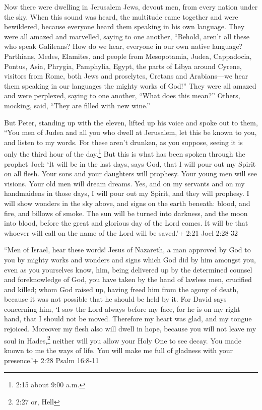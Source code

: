  Now there were dwelling in Jerusalem Jews, devout men, from
every nation under the sky.  When this sound was heard, the
multitude came together and were bewildered, because everyone heard them
speaking in his own language.  They were all amazed and
marvelled, saying to one another, ``Behold, aren't all these who speak
Galileans?  How do we hear, everyone in our own native
language?  Parthians, Medes, Elamites, and people from
Mesopotamia, Judea, Cappadocia, Pontus, Asia,  Phrygia,
Pamphylia, Egypt, the parts of Libya around Cyrene, visitors from Rome,
both Jews and proselytes,  Cretans and Arabians---we hear
them speaking in our languages the mighty works of God!'' 
They were all amazed and were perplexed, saying to one another, ``What
does this mean?''  Others, mocking, said, ``They are filled
with new wine.''

 But Peter, standing up with the eleven, lifted up his
voice and spoke out to them, ``You men of Judea and all you who dwell at
Jerusalem, let this be known to you, and listen to my words.
 For these aren't drunken, as you suppose, seeing it is
only the third hour of the day.\footnote{2:15 about 9:00 a.m.}
 But this is what has been spoken through the prophet Joel:
 `It will be in the last days, says God, that I will pour
out my Spirit on all flesh. Your sons and your daughters will prophesy.
Your young men will see visions. Your old men will dream dreams.
 Yes, and on my servants and on my handmaidens in those
days, I will pour out my Spirit, and they will prophesy.  I
will show wonders in the sky above, and signs on the earth beneath:
blood, and fire, and billows of smoke.  The sun will be
turned into darkness, and the moon into blood, before the great and
glorious day of the Lord comes.  It will be that whoever
will call on the name of the Lord will be saved.'+ 2:21 Joel 2:28-32

 ``Men of Israel, hear these words! Jesus of Nazareth, a
man approved by God to you by mighty works and wonders and signs which
God did by him amongst you, even as you yourselves know, 
him, being delivered up by the determined counsel and foreknowledge of
God, you have taken by the hand of lawless men, crucified and killed;
 whom God raised up, having freed him from the agony of
death, because it was not possible that he should be held by it.
 For David says concerning him, `I saw the Lord always
before my face, for he is on my right hand, that I should not be moved.
 Therefore my heart was glad, and my tongue rejoiced.
Moreover my flesh also will dwell in hope,  because you
will not leave my soul in Hades,\footnote{2:27 or, Hell} neither will
you allow your Holy One to see decay.  You made known to me
the ways of life. You will make me full of gladness with your
presence.'+ 2:28 Psalm 16:8-11

